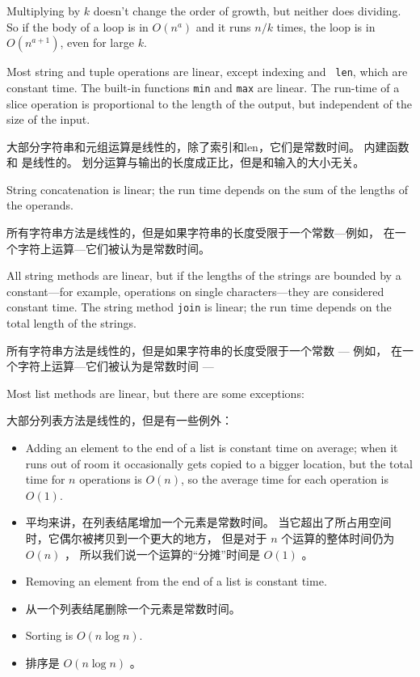 Multiplying by $k$ doesn't change the order of growth, but neither
does dividing.  So if the body of a loop is in $O(n^a)$ and it runs
$n/k$ times, the loop is in $O(n^{a+1})$, even for large $k$.


Most string and tuple operations are linear, except indexing and {\tt
  len}, which are constant time.  The built-in functions {\tt min} and
{\tt max} are linear.  The run-time of a slice operation is
proportional to the length of the output, but independent of the size
of the input.

大部分字符串和元组运算是线性的，除了索引和len，它们是常数时间。
内建函数  和  是线性的。
划分运算与输出的长度成正比，但是和输入的大小无关。
  
  

String concatenation is linear; the run time depends on the sum
of the lengths of the operands.

所有字符串方法是线性的，但是如果字符串的长度受限于一个常数—例如，
在一个字符上运算—它们被认为是常数时间。

All string methods are linear, but if the lengths of
the strings are bounded by a constant---for example, operations on single
characters---they are considered constant time.
The string method {\tt join} is linear; the run time depends on
the total length of the strings.

所有字符串方法是线性的，但是如果字符串的长度受限于一个常数 --- 例如，
在一个字符上运算—它们被认为是常数时间 ---

Most list methods are linear, but there are some exceptions:

大部分列表方法是线性的，但是有一些例外：

\begin{itemize}

\item Adding an element to the end of a list is constant time on
average; when it runs out of room it occasionally gets copied
to a bigger location, but the total time for $n$ operations
is $O(n)$, so the average time for each
operation is $O(1)$.

\item 平均来讲，在列表结尾增加一个元素是常数时间。 当它超出了所占用空间时，它偶尔被拷贝到一个更大的地方， 但是对于 $n$ 个运算的整体时间仍为 $O(n)$ ， 所以我们说一个运算的“分摊”时间是 $O(1)$ 。

\item Removing an element from the end of a list is constant time.

\item 从一个列表结尾删除一个元素是常数时间。

\item Sorting is $O(n \log n)$.

\item 排序是 $O(n \log n)$ 。
  

\end{itemize}

